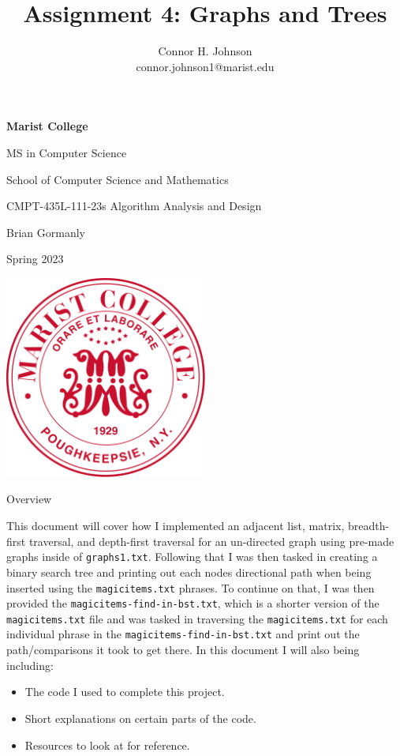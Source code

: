 \documentclass{article}
\title{Assignment 4: Graphs and Trees }
\author{Connor H. Johnson \\ connor.johnson1@marist.edu}
\begin{document}
\begin{center} \vfill
\textbf{\Large Marist College}

{\large MS in Computer Science

School of Computer Science and Mathematics \vfill

CMPT-435L-111-23s Algorithm Analysis and Design 

Brian Gormanly

Spring 2023 

\vfill
\includegraphics[width=0.5\textwidth]{Marist.png} \vfill

\emph{\Large\thetitle} \vfill 
\theauthor} \vfill

\end{center} \clearpage
\maketitle

\begin{center}
\begin{large}
    Overview
\end{large}    
\end{center}

\begin{center} \noindent
This document will cover how I implemented an adjacent list, matrix, breadth-first traversal, and depth-first traversal for an un-directed graph using pre-made graphs inside of \verb|graphs1.txt|. Following that I was then tasked in creating a binary search tree and printing out each nodes directional path when being inserted using the \verb|magicitems.txt| phrases. To continue on that, I was then provided the \verb|magicitems-find-in-bst.txt|, which is a shorter version of the \verb|magicitems.txt| file and was tasked in traversing the \verb|magicitems.txt| for each individual phrase in the \verb|magicitems-find-in-bst.txt| and print out the path/comparisons it took to get there. In this document I will also being including:
\begin{itemize}
\item The code I used to complete this project.
\item Short explanations on certain parts of the code.
\item Resources to look at for reference.

\end{itemize}
\end{center}
\end{document}
